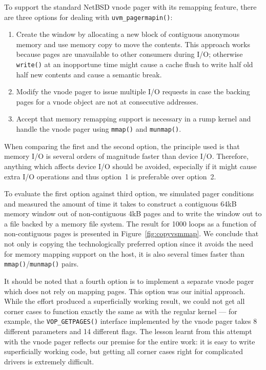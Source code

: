 To support the standard NetBSD vnode pager with its remapping
feature, there are three options for dealing with \verb+uvm_pagermapin()+:

\begin{enumerate}
\item   Create the window by allocating a new block of contiguous
	anonymous memory and use memory copy to move the contents.
	This approach works because pages are unavailable to other consumers
	during I/O; otherwise \eg \texttt{write()} at an inopportune
	time might cause a cache flush to write half old half new
	contents and cause a semantic break.

\item   Modify the vnode pager to issue multiple I/O requests in
	case the backing pages for a vnode object are not at
	consecutive addresses.

\item   Accept that memory remapping support is necessary in a rump
	kernel and handle the vnode pager using \texttt{mmap()}
	and \texttt{munmap()}.
\end{enumerate}

When comparing the first and the second option, the principle used
is that memory I/O is several orders of magnitude faster than device
I/O.  Therefore, anything which affects device I/O should be avoided,
especially if it might cause extra I/O operations and thus option~1
is preferable over option~2.

To evaluate the first option against third option, we simulated
pager conditions and measured the amount of time it takes to
construct a contiguous 64kB memory window out of non-contiguous
4kB pages and to write the window out to a file backed by a memory
file system.  The result for 1000 loops as a function of
non-contiguous pages is presented in Figure~\ref{fig:copyvsmmap}.
We conclude that not only is copying the technologically preferred
option since it avoids the need for memory mapping support on the
host, it is also several times faster than
\texttt{mmap()}/\texttt{munmap()} pairs.

It should be noted that a fourth option is to implement a separate
vnode pager which does not rely on mapping pages.  This option was our
initial approach.  While the effort produced a superficially working
result, we could not get all corner cases to function exactly the
same as with the regular kernel --- for example, the \verb+VOP_GETPAGES()+
interface implemented by the vnode pager takes 8 different parameters
and 14 different flags.  The lesson learnt from this attempt with
the vnode pager reflects our premise for the entire work: it is
easy to write superficially working code, but getting all corner
cases right for complicated drivers is extremely difficult.

